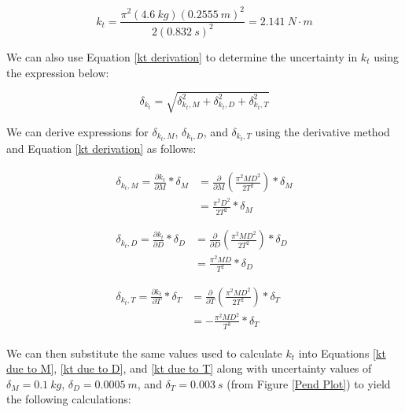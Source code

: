 \documentclass[12pt]{article}
\begin{document}
\begin{equation}
    k_t=\frac{\pi^2(4.6\ kg)(0.2555\ m)^2}{2(0.832\ s)^2}=2.141\ N\cdot m
\end{equation}

\noindent We can also use Equation \ref{kt derivation} to determine the uncertainty in $k_t$ using the expression below:

\begin{equation}
    \delta_{k_t}=\sqrt{\delta_{k_t,M}^2+\delta_{k_t,D}^2+\delta_{k_t,T}^2} \label{UNC in kt}
\end{equation}

We can derive expressions for $\delta_{k_t,M}$, $\delta_{k_t,D}$, and $\delta_{k_t,T}$ using the derivative method and Equation \ref{kt derivation} as follows:

\begin{align}
    \begin{split}
        \delta_{k_t,M}=\frac{\partial k_t}{\partial M}*\delta_M&=\frac{\partial}{\partial M}(\frac{\pi^2MD^2}{2T^2})*\delta_M \\
        &=\frac{\pi^2D^2}{2T^2}*\delta_M \label{kt due to M}
    \end{split} \\ \nonumber \\
    \begin{split}
        \delta_{k_t,D}=\frac{\partial k_t}{\partial D}*\delta_D&=\frac{\partial}{\partial D}(\frac{\pi^2MD^2}{2T^2})*\delta_D \\
        &=\frac{\pi^2MD}{T^2}*\delta_D \label{kt due to D}
    \end{split} \\ \nonumber \\
    \begin{split}
        \delta_{k_t,T}=\frac{\partial k_t}{\partial T}*\delta_T&=\frac{\partial}{\partial T}(\frac{\pi^2MD^2}{2T^2})*\delta_T \\
        &=-\frac{\pi^2MD^2}{T^3}*\delta_T \label{kt due to T}
    \end{split}
\end{align}

We can then substitute the same values used to calculate $k_t$ into Equations \ref{kt due to M}, \ref{kt due to D}, and \ref{kt due to T} along with uncertainty values of $\delta_M=0.1\ kg$, $\delta_D=0.0005\ m$, and $\delta_T=0.003\ s$ (from Figure \ref{Pend Plot}) to yield the following calculations:
\end{document}
